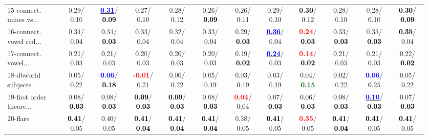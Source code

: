 \begin{table}[h]
\begin{center}
{\begin{tabular}{lc|c|c|c|c|c|c|c|c|c|c}
15-connect. mines vs... &   0.29/  0.10 & \underline{\textcolor{blue}{\textbf{  0.31}}}/\textcolor{black}{\textbf{  0.09}} &   0.27/  0.10 &   0.28/  0.12 &   0.26/\textcolor{black}{\textbf{  0.09}} &   0.26/  0.11 &   0.29/  0.10 & \textcolor{black}{\textbf{  0.30}}/  0.12 &   0.28/  0.10 &   0.28/  0.10 & \textcolor{black}{\textbf{  0.30}}/\textcolor{black}{\textbf{  0.09}} \\
16-connect. vowel red... &   0.34/  0.04 &   0.34/\textcolor{black}{\textbf{  0.03}} &   0.33/  0.04 &   0.32/  0.04 &   0.33/  0.04 &   0.29/\textcolor{black}{\textbf{  0.03}} & \underline{\textcolor{blue}{\textbf{  0.36}}}/  0.04 & \textcolor{red}{\textbf{  0.24}}/\textcolor{black}{\textbf{  0.03}} &   0.33/\textcolor{black}{\textbf{  0.03}} &   0.33/\textcolor{black}{\textbf{  0.03}} & \textcolor{black}{\textbf{  0.35}}/  0.04 \\
17-connect. vowel... &   0.21/  0.03 &   0.21/  0.03 &   0.20/  0.03 &   0.20/  0.03 &   0.20/  0.03 &   0.19/\textcolor{black}{\textbf{  0.02}} & \underline{\textcolor{blue}{\textbf{  0.24}}}/  0.03 & \textcolor{red}{\textbf{  0.14}}/\textcolor{black}{\textbf{  0.02}} &   0.21/  0.03 &   0.21/  0.03 &   0.22/\textcolor{black}{\textbf{  0.02}} \\
18-dbworld subjects &   0.05/  0.22 & \textcolor{blue}{\textbf{  0.06}}/\textcolor{black}{\textbf{  0.18}} & \textcolor{red}{\textbf{ -0.01}}/  0.21 &   0.00/  0.22 &   0.05/  0.19 &   0.03/  0.19 &   0.03/  0.19 &   0.04/\textcolor{darkgreen}{\textbf{  0.15}} &   0.02/  0.22 & \textcolor{blue}{\textbf{  0.06}}/  0.25 &   0.05/  0.22 \\
19-first order theore... &   0.08/\textcolor{black}{\textbf{  0.03}} &   0.08/\textcolor{black}{\textbf{  0.03}} & \textcolor{black}{\textbf{  0.09}}/\textcolor{black}{\textbf{  0.03}} & \textcolor{black}{\textbf{  0.09}}/\textcolor{black}{\textbf{  0.03}} &   0.08/\textcolor{black}{\textbf{  0.03}} & \textcolor{red}{\textbf{  0.04}}/  0.04 &   0.07/\textcolor{black}{\textbf{  0.03}} &   0.06/\textcolor{black}{\textbf{  0.03}} &   0.08/\textcolor{black}{\textbf{  0.03}} & \underline{\textcolor{blue}{\textbf{  0.10}}}/\textcolor{black}{\textbf{  0.03}} &   0.07/\textcolor{black}{\textbf{  0.03}} \\
20-flare & \textcolor{black}{\textbf{  0.41}}/  0.05 &   0.40/  0.05 & \textcolor{black}{\textbf{  0.41}}/\textcolor{black}{\textbf{  0.04}} & \textcolor{black}{\textbf{  0.41}}/\textcolor{black}{\textbf{  0.04}} & \textcolor{black}{\textbf{  0.41}}/\textcolor{black}{\textbf{  0.04}} &   0.38/  0.05 & \textcolor{black}{\textbf{  0.41}}/  0.05 & \textcolor{red}{\textbf{  0.35}}/  0.05 & \textcolor{black}{\textbf{  0.41}}/\textcolor{black}{\textbf{  0.04}} & \textcolor{black}{\textbf{  0.41}}/  0.05 & \textcolor{black}{\textbf{  0.41}}/  0.05 \\

\end{tabular}}
\end{center}
\end{table}
